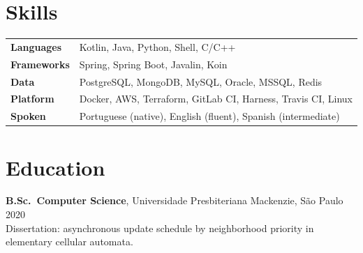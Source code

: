\documentclass[10pt,a4paper]{article}
\begin{document}
\section{Skills}
\noindent
\begin{tabularx}{\linewidth}{@{}lX@{}}
\textbf{Languages} & Kotlin, Java, Python, Shell, C/C++ \\
\textbf{Frameworks} & Spring, Spring Boot, Javalin, Koin \\
\textbf{Data} & PostgreSQL, MongoDB, MySQL, Oracle, MSSQL, Redis \\
\textbf{Platform} & Docker, AWS, Terraform, GitLab CI, Harness, Travis CI, Linux \\
\textbf{Spoken} & Portuguese (native), English (fluent), Spanish (intermediate) \\
\end{tabularx}

\section{Education}
\noindent\textbf{B.Sc.\ Computer Science}, Universidade Presbiteriana Mackenzie, São Paulo \hfill 2020\\
\textcolor{muted}{Dissertation: asynchronous update schedule by neighborhood priority in elementary cellular automata.}
\end{document}

